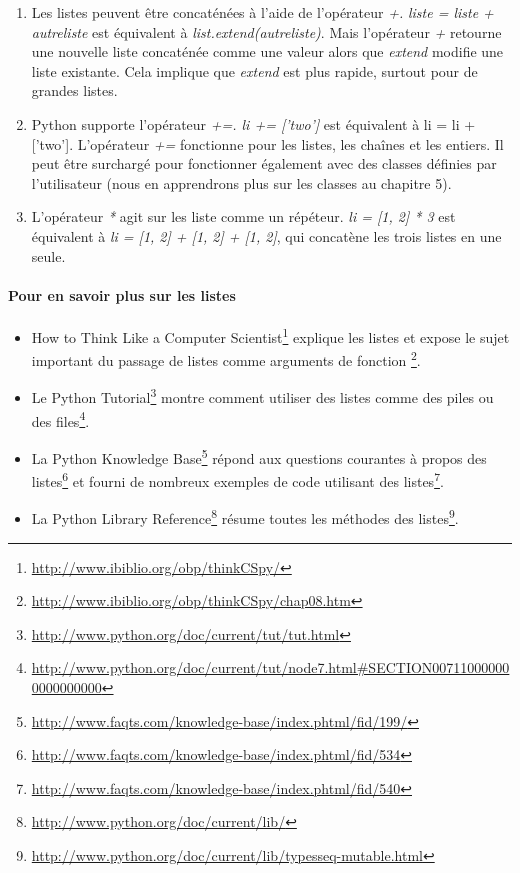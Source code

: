 \begin{enumerate}
\item{Les listes peuvent être concaténées à l'aide de l'opérateur \emph{+.} \emph{liste = liste + autreliste} est équivalent à \emph{list.extend(autreliste)}. Mais l'opérateur \emph{+} retourne une nouvelle liste concaténée comme une valeur alors que \emph{extend} modifie une liste existante. Cela implique que \emph{extend} est plus rapide, surtout pour de grandes listes.}
\item{Python supporte l'opérateur \emph{+=. li += ['two']} est équivalent à li = li + ['two']. L'opérateur \emph{+=} fonctionne pour les listes, les chaînes et les entiers. Il peut être surchargé pour fonctionner également avec des classes définies par l'utilisateur (nous en apprendrons plus sur les classes au chapitre 5).}
\item{L'opérateur \emph{*} agit sur les liste comme un répéteur. \emph{li = [1, 2] * 3} est équivalent à \emph{li = [1, 2] + [1, 2] + [1, 2]}, qui concatène les trois listes en une seule.}
\end{enumerate}

\paragraph{Pour en savoir plus sur les listes}
\begin{itemize}
\item{How to Think Like a Computer Scientist\footnote{\url{http://www.ibiblio.org/obp/thinkCSpy/}} explique les listes et expose le sujet important du passage de listes comme arguments de fonction \footnote{\url{http://www.ibiblio.org/obp/thinkCSpy/chap08.htm}}.}
\item{Le Python Tutorial\footnote{\url{http://www.python.org/doc/current/tut/tut.html}} montre comment utiliser des listes comme des piles ou des files\footnote{\url{http://www.python.org/doc/current/tut/node7.html\#SECTION007110000000000000000}}.}
\item{La Python Knowledge Base\footnote{\url{http://www.faqts.com/knowledge-base/index.phtml/fid/199/}} répond aux questions courantes à propos des listes\footnote{\url{http://www.faqts.com/knowledge-base/index.phtml/fid/534}} et fourni de nombreux exemples de code utilisant des listes\footnote{\url{http://www.faqts.com/knowledge-base/index.phtml/fid/540}}.}
\item{La Python Library Reference\footnote{\url{http://www.python.org/doc/current/lib/}} résume toutes les méthodes des listes\footnote{\url{http://www.python.org/doc/current/lib/typesseq-mutable.html}}.}
\end{itemize}


